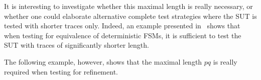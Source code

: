 It is interesting to investigate whether this maximal length is really
necessary, or whether one could elaborate alternative complete test
strategies where the SUT is tested with shorter traces only. Indeed, an
example  presented in~\cite[Exercise~5]{PeleskaHuangLectureNotesMBT} shows
that when testing for equivalence of deterministic FSMs, it is sufficient to
test the SUT with traces of significantly shorter length.

The following example, however, shows that the maximal length $pq$ is really
required when testing for refinement.
%
%
%

